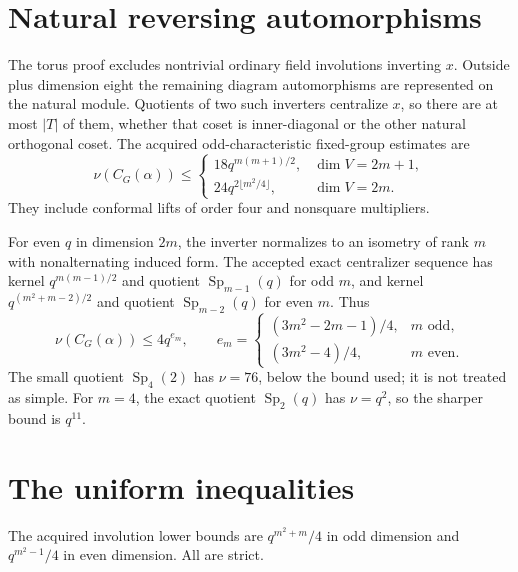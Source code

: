 \documentclass[11pt,a4paper]{article}
\newcommand{\Sp}{\operatorname{Sp}}\newcommand{\Aut}{\operatorname{Aut}}
\begin{document}
\section{Natural reversing automorphisms}
The torus proof excludes nontrivial ordinary field involutions inverting
$x$. Outside plus dimension eight the remaining diagram automorphisms
are represented on the natural module. Quotients of two such inverters
centralize $x$, so there are at most $|T|$ of them, whether that coset
is inner-diagonal or the other natural orthogonal coset.
The acquired odd-characteristic fixed-group estimates are
\[
 \nu(C_G(\alpha))\le
 \begin{cases}
 18q^{m(m+1)/2},&\dim V=2m+1,\\
 24q^{2\lfloor m^2/4\rfloor},&\dim V=2m.
 \end{cases}                                                   \tag{8}
\]
They include conformal lifts of order four and nonsquare multipliers.

For even $q$ in dimension $2m$, the inverter normalizes to an isometry
of rank $m$ with nonalternating induced form. The accepted exact
centralizer sequence has kernel $q^{m(m-1)/2}$ and quotient
$\Sp_{m-1}(q)$ for odd $m$, and kernel $q^{(m^2+m-2)/2}$ and
quotient $\Sp_{m-2}(q)$ for even $m$. Thus
\begin{equation}\label{evenfixed}
 \nu(C_G(\alpha))\le4q^{e_m},\qquad
 e_m=\begin{cases}(3m^2-2m-1)/4,&m\text{ odd},\\
                  (3m^2-4)/4,&m\text{ even}.
       \end{cases}
\end{equation}
The small quotient $\Sp_4(2)$ has $\nu=76$, below the bound used;
it is not treated as simple. For $m=4$, the exact quotient
$\Sp_2(q)$ has $\nu=q^2$, so the sharper bound is $q^{11}$.

\section{The uniform inequalities}
The acquired involution lower bounds are $q^{m^2+m}/4$ in odd
dimension and $q^{m^2-1}/4$ in even dimension. All are strict.
\end{document}

